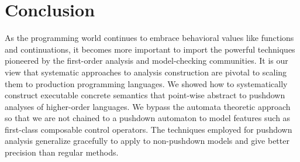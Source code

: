 \documentclass[preprint,nocopyrightspace]{sigplanconf}
\begin{document}
\section{Conclusion}
As the programming world continues to embrace behavioral values like functions and continuations, it becomes more important to import the powerful techniques pioneered by the first-order analysis and model-checking communities.
%
It is our view that systematic approaches to analysis construction are pivotal to scaling them to production programming languages.
%
We showed how to systematically construct executable concrete semantics that point-wise abstract to pushdown analyses of higher-order languages.
%
We bypass the automata theoretic approach so that we are not chained to a pushdown automaton to model features such as first-class composable control operators.
%
The techniques employed for pushdown analysis generalize gracefully to apply to non-pushdown models and give better precision than regular methods.

\balance


\end{document}
